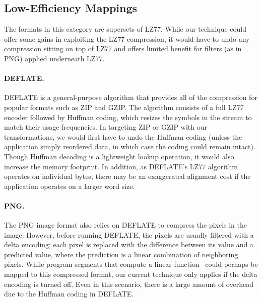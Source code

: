 \subsection{Low-Efficiency Mappings}
\label{sec:formats-bad}

The formats in this category are supersets of LZ77.  While our
technique could offer some gains in exploiting the LZ77 compression,
it would have to undo any compression sitting on top of LZ77 and
offers limited benefit for filters (as in PNG) applied underneath
LZ77.

\paragraph{DEFLATE.}
DEFLATE is a general-purpose algorithm that provides all of the
compression for popular formats such as ZIP and GZIP.  The algorithm
consists of a full LZ77 encoder followed by Huffman coding, which
resizes the symbols in the stream to match their usage frequencies.
In targeting ZIP or GZIP with our transformations, we would first
have to undo the Huffman coding (unless the application simply
reordered data, in which case the coding could remain intact).  Though
Huffman decoding is a lightweight lookup operation, it would also
increase the memory footprint.  In addition, as DEFLATE's LZ77
algorithm operates on individual bytes, there may be an exaggerated
alignment cost if the application operates on a larger word size.


\paragraph{PNG.}
The PNG image format also relies on DEFLATE to compress the pixels in
the image.  However, before running DEFLATE, the pixels are usually
filtered with a delta encoding; each pixel is replaced with the
difference between its value and a predicted value, where the
prediction is a linear combination of neighboring pixels.  While
program segments that compute a linear function~\cite{aalamb} could
perhaps be mapped to this compressed format, our current technique
only applies if the delta encoding is turned off.  Even in this
scenario, there is a large amount of overhead due to the Huffman
coding in DEFLATE.

